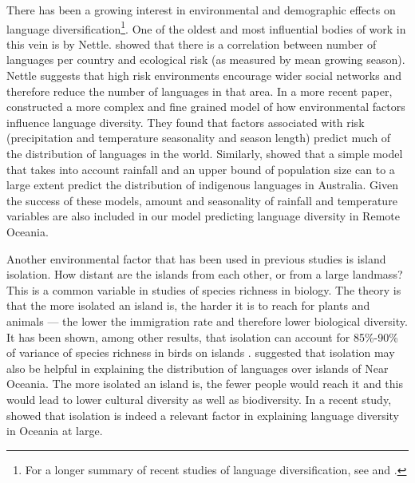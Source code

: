 \documentclass[a4paper,10pt]{article} %
\begin{document}

There has been a growing interest in environmental and demographic effects on language diversification\footnote{For a longer summary of recent studies of language diversification, see \citet{gavin2013toward} and \citet{greenhill2015demographic}.}. One of the oldest and most influential bodies of work in this vein is by Nettle. \citet{NETTLE1998} showed that there is a correlation between number of languages per country and ecological risk (as measured by mean growing season). Nettle suggests that high risk environments encourage wider social networks and therefore reduce the number of languages in that area. In a more recent paper, \citet{hua2019ecological} constructed a more complex and fine grained model of how environmental factors influence language diversity. They found that factors associated with risk (precipitation and temperature seasonality and season length) predict much of the distribution of languages in the world. Similarly, \citet{gavin2017process} showed that a simple model that takes into account rainfall and an upper bound of population size can to a large extent predict the distribution of indigenous languages in Australia. Given the success of these models, amount and seasonality of rainfall and temperature variables are also included in our model predicting language diversity in Remote Oceania. 

Another environmental factor that has been used in previous studies is island isolation. How distant are the islands from each other, or from a large landmass? This is a common variable in studies of species richness  in biology. The theory is that the more isolated an island is, the harder it is to reach for plants and animals --- the lower the immigration rate and therefore lower biological diversity. It has been shown, among other results, that isolation can account for 85\%-90\% of variance of species richness in birds on islands \citep{kalmar2006global}. \citet{terrell1976island} suggested that isolation may also be helpful in explaining the distribution of languages over islands of Near Oceania. The more isolated an island is, the fewer people would reach it and this would lead to lower cultural diversity as well as biodiversity. In a recent study, \citet{gavin2012island} showed that isolation is indeed a relevant factor in explaining language diversity in Oceania at large. 
\end{document}
